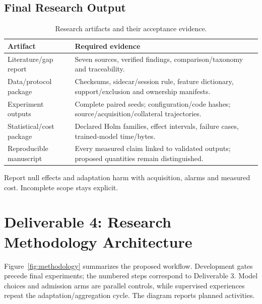 \documentclass[10pt,a4paper]{article}
\begin{document}
\subsection{Final Research Output}
\begin{table}[htbp]
\centering\footnotesize
\caption{Research artifacts and their acceptance evidence.}
\label{tab:artifacts}
\begin{tabularx}{\linewidth}{L{3.2cm}Y}
\toprule
Artifact & Required evidence\\
\midrule
Literature/gap report & Seven sources, verified findings, comparison/taxonomy and traceability.\\
Data/protocol package & Checksums, sidecar/session rule, feature dictionary, support/exclusion and ownership manifests.\\
Experiment outputs & Complete paired seeds; configuration/code hashes; source/acquisition/collateral trajectories.\\
Statistical/cost package & Declared Holm families, effect intervals, failure cases, trained-model time/bytes.\\
Reproducible manuscript & Every measured claim linked to validated outputs; proposed quantities remain distinguished.\\
\bottomrule
\end{tabularx}
\end{table}
Report null effects and adaptation harm with acquisition, alarms and measured cost. Incomplete scope stays explicit.

\clearpage
\section{Deliverable 4: Research Methodology Architecture}
Figure~\ref{fig:methodology} summarizes the proposed workflow. Development gates precede final experiments; the numbered steps correspond to Deliverable 3. Model choices and admission arms are parallel controls, while supervised experiences repeat the adaptation/aggregation cycle. The diagram reports planned activities.
\end{document}
